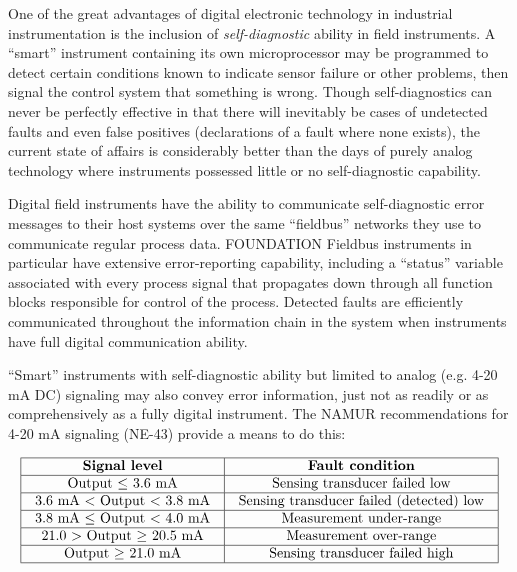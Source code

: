 One of the great advantages of digital electronic technology in industrial instrumentation is the inclusion of \textit{self-diagnostic} ability in field instruments.  A ``smart'' instrument containing its own microprocessor may be programmed to detect certain conditions known to indicate sensor failure or other problems, then signal the control system that something is wrong.  Though self-diagnostics can never be perfectly effective in that there will inevitably be cases of undetected faults and even false positives (declarations of a fault where none exists), the current state of affairs is considerably better than the days of purely analog technology where instruments possessed little or no self-diagnostic capability.    

Digital field instruments have the ability to communicate self-diagnostic error messages to their host systems over the same ``fieldbus'' networks they use to communicate regular process data.  FOUNDATION Fieldbus instruments in particular have extensive error-reporting capability, including a ``status'' variable associated with every process signal that propagates down through all function blocks responsible for control of the process.  Detected faults are efficiently communicated throughout the information chain in the system when instruments have full digital communication ability.

\filbreak

``Smart'' instruments with self-diagnostic ability but limited to analog (e.g. 4-20 mA DC) signaling may also convey error information, just not as readily or as comprehensively as a fully digital instrument.  The NAMUR recommendations for 4-20 mA signaling (NE-43) provide a means to do this:  


$$\vbox{\offinterlineskip
\halign{\strut
\vrule \quad\hfil # \ \hfil & 
\vrule \quad\hfil # \ \hfil \vrule \cr
\noalign{\hrule}
%
\textbf{Signal level} & \textbf{Fault condition} \cr
%
\noalign{\hrule}
%
Output $\leq$ 3.6 mA & Sensing transducer failed low \cr
%
\noalign{\hrule}
%
3.6 mA $<$ Output $<$ 3.8 mA & Sensing transducer failed (detected) low \cr
%
\noalign{\hrule}
%
3.8 mA $\leq$ Output $<$ 4.0 mA & Measurement under-range \cr
%
\noalign{\hrule}
%
21.0 $>$ Output $\geq$ 20.5 mA & Measurement over-range \cr
%
\noalign{\hrule}
%
Output $\geq$ 21.0 mA & Sensing transducer failed high \cr
%
\noalign{\hrule}
} %
}$$ %

